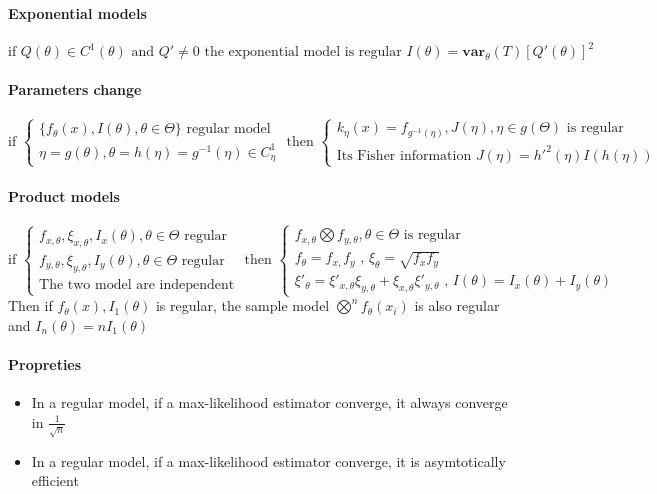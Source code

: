 \documentclass[a4paper,10pt]{article}
\begin{document}
\paragraph{Exponential models}
\[
\text{if } Q(\theta) \in C^{1}(\theta) \text{ and } Q'\neq 0 \text{ the exponential model is regular } I(\theta) = \textbf{var}_{\theta}(T)[Q'(\theta)]^2
\]
\paragraph{Parameters change}
\[
\text{if }
\left\{
\begin{array}{l}
\{f_{\theta}(x) ,I(\theta) , \theta \in \Theta\} \text{ regular model} \\
\eta = g(\theta), \theta = h(\eta)=g^{-1}(\eta) \in C^1_{\eta}
\end{array}\right.
\text{ then }
\left\{
\begin{array}{l}
k_{\eta}(x) = f_{g^{-1}(\eta)} ,J(\eta), \eta \in g(\Theta) \text{ is regular} \\
\text{Its Fisher information } J(\eta) =  h'^2(\eta) I(h(\eta)) 
\end{array}\right.
\]
\paragraph{Product models}
\[
\text{if }
\left\{
\begin{array}{l}
f_{x,\theta}, \xi_{x,\theta} , I_{x}(\theta) , \theta \in \Theta \text{ regular} \\
f_{y,\theta}, \xi_{y,\theta} , I_{y}(\theta) , \theta \in \Theta \text{ regular} \\
\text{The two model are independent}
\end{array}\right.
\text{ then }
\left\{
\begin{array}{l}
f_{x,\theta} \bigotimes f_{y,\theta}, \theta \in \Theta \text{ is regular}\\
f_{\theta} = f_{x,} f_{y} \text{ , } \xi_{\theta} = \sqrt{f_{x} f_{y}}\\
\xi'_{\theta} = \xi'_{x,\theta}\xi_{y,\theta} + \xi_{x,\theta}\xi'_{y,\theta} \text{ , } I(\theta)=I_x(\theta)+I_y(\theta) 
\end{array}\right.
\]
Then if {$ f_{\theta}(x) ,I_1(\theta) $} is regular, the sample model $ \bigotimes^n f_{\theta}(x_i)$ is also regular and $I_n(\theta) = n I_1(\theta)$
\paragraph{Propreties}
\begin{itemize}
 \item In a regular model, if a max-likelihood estimator converge, it always converge in $\frac{1}{\sqrt{n}}$
 \item In a regular model, if a max-likelihood estimator converge, it is asymtotically efficient
\end{itemize}
\end{document}

